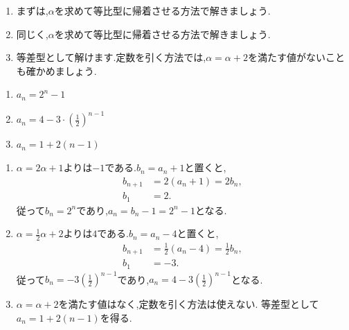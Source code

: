   \noindent{}\par\nobreak
  \begin{enumerate}[label=(\arabic*),parsep=3pt,format=\bookitemlink{example-characteristic-1}{hint}{answer}]
    \item まずは,$\alpha$を求めて等比型に帰着させる方法で解きましょう.
    \item 同じく,$\alpha$を求めて等比型に帰着させる方法で解きましょう.
    \item 等差型として解けます.定数を引く方法では,$\alpha=\alpha+2$を満たす値がないことも確かめましょう.
  \end{enumerate}
  
  \noindent{}\par\nobreak
  \begin{enumerate}[label=(\arabic*),parsep=3pt,format=\bookitemlink{example-characteristic-1}{answer}{solution}]
    \item $a_n=2^n-1$
    \item $a_n=4-3\cdot\left(\frac{1}{2}\right)^{n-1}$
    \item $a_n=1+2(n-1)$
  \end{enumerate}
  
  \noindent{}\par\nobreak
  \begin{enumerate}[label=(\arabic*),parsep=3pt,format=\bookitemlink{example-characteristic-1}{solution}{problem}]
    \item $\alpha=2\alpha+1$よりは$-1$である.$b_n=a_n+1$と置くと,
      \[
        \begin{aligned}
          b_{n+1}&=2(a_n+1)=2b_n,\\
          b_1&=2.
        \end{aligned}
      \]
      従って$b_n=2^n$であり,$a_n=b_n-1=2^n-1$となる.
    \item $\alpha=\frac12\alpha+2$よりは$4$である.$b_n=a_n-4$と置くと,
      \[
        \begin{aligned}
          b_{n+1}&=\frac12(a_n-4)=\frac12b_n,\\
          b_1&=-3.
        \end{aligned}
      \]
      従って$b_n=-3\left(\frac12\right)^{n-1}$であり,$a_n=4-3\left(\frac12\right)^{n-1}$となる.
    \item $\alpha=\alpha+2$を満たす値はなく,定数を引く方法は使えない.
      等差型として$a_n=1+2(n-1)$を得る.
  \end{enumerate}

